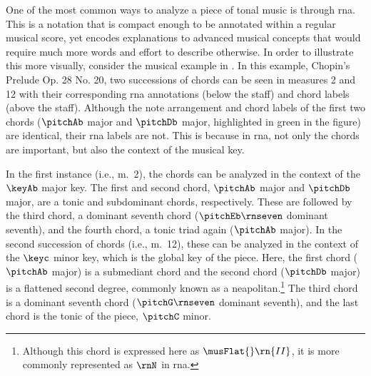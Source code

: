 
One of the most common ways to analyze a piece of tonal
music is through \gls{rna}. This is a notation that is
compact enough to be annotated within a regular musical
score, yet encodes explanations to advanced musical concepts
that would require much more words and effort to describe
otherwise. In order to illustrate this more visually,
consider the musical example in
. In this example, Chopin's
Prelude Op. 28 No. 20, two successions of chords can be seen
in measures 2 and 12 with their corresponding \gls{rna}
annotations (below the staff) and chord labels (above the
staff). Although the note arrangement and chord labels of
the first two chords ($\pitchAb$ major and $\pitchDb$ major,
highlighted in green in the figure) are identical, their
\gls{rna} labels are not. This is because in \gls{rna}, not
only the chords are important, but also the context of the
musical key.


In the first instance (i.e., m.~2), the chords can be
analyzed in the context of the $\keyAb$ major key. The first
and second chord, $\pitchAb$ major and $\pitchDb$ major, are
a tonic and subdominant chords, respectively. These are
followed by the third chord, a dominant seventh chord
($\pitchEb\rnseven$ dominant seventh), and the fourth chord,
a tonic triad again ($\pitchAb$ major). In the second
succession of chords (i.e., m.~12), these can be analyzed in
the context of the $\keyc$ minor key, which is the global
key of the piece. Here, the first chord ($\pitchAb$ major)
is a submediant chord and the second chord ($\pitchDb$
major) is a flattened second degree, commonly known as a
\gls{neapolitan}.\footnote{Although this chord is expressed
here as $\musFlat{}\rn{II}$, it is more commonly represented
as $\rnN$ in \gls{rna}.} The third chord is a dominant
seventh chord ($\pitchG\rnseven$ dominant seventh), and the
last chord is the tonic of the piece, $\pitchC$ minor.

